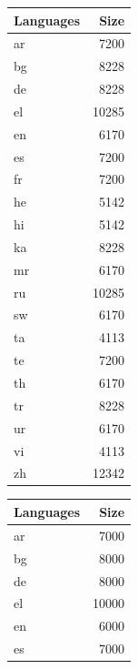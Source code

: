 \begin{figure}[h]
\begin{subtable}{0.32\textwidth}
    \end{subtable}
    \hfill
    \begin{subtable}{0.32\textwidth}
        \centering
        \begin{tabular}{lr}
            \toprule
            Languages & Size \\
            \midrule
            ar & 7200 \\
            bg & 8228 \\
            de & 8228 \\
            el & 10285 \\
            en & 6170 \\
            es & 7200 \\
            fr & 7200 \\
            he & 5142 \\
            hi & 5142 \\
            ka & 8228 \\
            mr & 6170 \\
            ru & 10285 \\
            sw & 6170 \\
            ta & 4113 \\
            te & 7200 \\
            th & 6170 \\
            tr & 8228 \\
            ur & 6170 \\
            vi & 4113 \\
            zh & 12342 \\
            \bottomrule
        \end{tabular}
        \caption{\citet{liang_xlm-v_2023}}
        \label{tab:liang_clusters_k20}
    \end{subtable}
    \hfill
    \begin{subtable}{0.32\textwidth}
        \centering
        \begin{tabular}{lr}
            \toprule
            Languages & Size \\
            \midrule
            ar & 7000 \\
            bg & 8000 \\
            de & 8000 \\
            el & 10000 \\
            en & 6000 \\
            es & 7000 \\

\end{tabular}
\end{subtable}
\end{figure}
